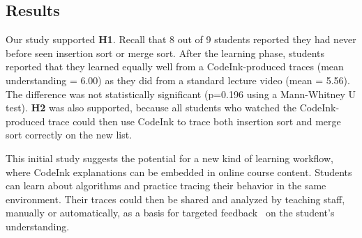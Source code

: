 \subsection{Results}
Our study supported \textbf{H1}. Recall that
8 out of 9 students reported they had never before seen insertion sort
or merge sort. After the learning phase, students reported that they
learned equally well from a CodeInk-produced traces (mean understanding
= 6.00) as they did from a standard lecture video (mean = 5.56). The
difference was not statistically significant (p=0.196 using a
Mann-Whitney U test). \textbf{H2} was also supported, because all
students who watched the CodeInk-produced trace could then use CodeInk
to trace both insertion sort and merge sort correctly on the new list.



This initial study suggests the potential for a new kind of learning
workflow, where CodeInk explanations can be embedded in online course
content. Students can learn about algorithms and practice tracing their
behavior in the same environment. Their traces could then be shared and
analyzed by teaching staff, manually or automatically, as a basis for
targeted feedback~\cite{Balzer1989} on the student's understanding.

